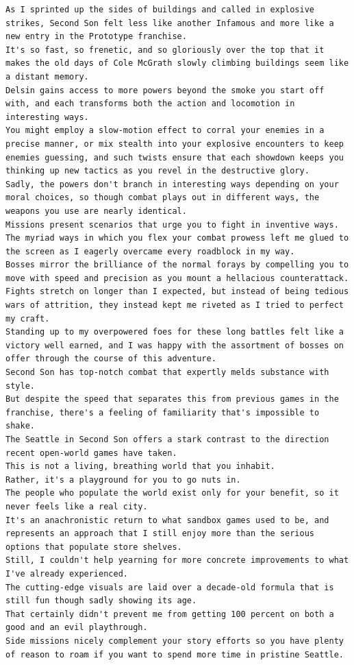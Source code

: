 \documentclass[BTech]{nitgoathesis}
\begin{document}
\begin{lstlisting}[basicstyle=\scriptsize]
As I sprinted up the sides of buildings and called in explosive strikes, Second Son felt less like another Infamous and more like a new entry in the Prototype franchise.
It's so fast, so frenetic, and so gloriously over the top that it makes the old days of Cole McGrath slowly climbing buildings seem like a distant memory.
Delsin gains access to more powers beyond the smoke you start off with, and each transforms both the action and locomotion in interesting ways.
You might employ a slow-motion effect to corral your enemies in a precise manner, or mix stealth into your explosive encounters to keep enemies guessing, and such twists ensure that each showdown keeps you thinking up new tactics as you revel in the destructive glory.
Sadly, the powers don't branch in interesting ways depending on your moral choices, so though combat plays out in different ways, the weapons you use are nearly identical.
Missions present scenarios that urge you to fight in inventive ways.
The myriad ways in which you flex your combat prowess left me glued to the screen as I eagerly overcame every roadblock in my way.
Bosses mirror the brilliance of the normal forays by compelling you to move with speed and precision as you mount a hellacious counterattack.
Fights stretch on longer than I expected, but instead of being tedious wars of attrition, they instead kept me riveted as I tried to perfect my craft.
Standing up to my overpowered foes for these long battles felt like a victory well earned, and I was happy with the assortment of bosses on offer through the course of this adventure.
Second Son has top-notch combat that expertly melds substance with style.
But despite the speed that separates this from previous games in the franchise, there's a feeling of familiarity that's impossible to shake.
The Seattle in Second Son offers a stark contrast to the direction recent open-world games have taken.
This is not a living, breathing world that you inhabit.
Rather, it's a playground for you to go nuts in.
The people who populate the world exist only for your benefit, so it never feels like a real city.
It's an anachronistic return to what sandbox games used to be, and represents an approach that I still enjoy more than the serious options that populate store shelves.
Still, I couldn't help yearning for more concrete improvements to what I've already experienced.
The cutting-edge visuals are laid over a decade-old formula that is still fun though sadly showing its age.
That certainly didn't prevent me from getting 100 percent on both a good and an evil playthrough.
Side missions nicely complement your story efforts so you have plenty of reason to roam if you want to spend more time in pristine Seattle.

\end{lstlisting}
\end{document}
